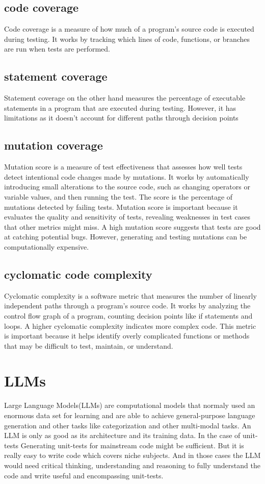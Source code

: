 \documentclass[a4paper,11pt,oneside]{memoir}
\begin{document}
\subsection{code coverage}
Code coverage is a measure of how much of a program's source code is executed during testing. It works by tracking which lines of code, functions, or branches are run when tests are performed.  
\subsection{statement coverage}
Statement coverage on the other hand measures the percentage of executable statements in a program that are executed during testing. However, it has limitations as it doesn't account for different paths through decision points
\subsection{mutation coverage}
Mutation score is a measure of test effectiveness that assesses how well tests detect intentional code changes made by mutations. It works by automatically introducing small alterations to the source code, such as changing operators or variable values, and then running the test. The score is the percentage of mutations detected by failing tests. Mutation score is important because it evaluates the quality and sensitivity of tests, revealing weaknesses in test cases that other metrics might miss. A high mutation score suggests that tests are good at catching potential bugs. However, generating and testing mutations can be computationally expensive.
\subsection{cyclomatic code complexity}
Cyclomatic complexity is a software metric that measures the number of linearly independent paths through a program's source code. It works by analyzing the control flow graph of a program, counting decision points like if statements and loops. A higher cyclomatic complexity indicates more complex code. This metric is important because it helps identify overly complicated functions or methods that may be difficult to test, maintain, or understand. 
\section{LLMs}
Large Language Models(LLMs) are computational models that normaly used an enormous data set for learning and are able to achieve general-purpose language generation and other tasks like categorization and other multi-modal tasks. An LLM is only as good as its architecture and its training data. 
In the case of unit-tests
Generating unit-tests for mainstream code might be sufficient. But it is really easy to write code which covers niche subjects. And in those cases the LLM would need critical thinking, understanding and reasoning to fully understand the code and write useful and encompassing unit-tests.
\end{document}

